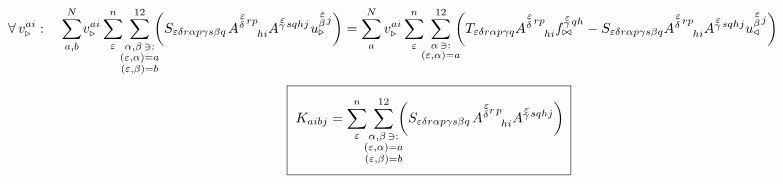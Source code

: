\begin{equation}
   \hspace{-18mm}
   \forall \, v^{ai}_{\triangleright}: \quad
   \sum^N_{a,b} \mkern-2mu v^{a i}_{\triangleright}
   \sum^n_\varepsilon
   \mkern-7mu
   \sum_{\substack{\alpha, \beta \, \ni: \\ (\varepsilon,\alpha) = a \\ (\varepsilon,\beta) = b}}^{12}
   \mkern-10mu
   \qty(
   S_{\varepsilon \delta r \alpha p \gamma s \beta q} \mkern2mu
   A^{\substack{\mkern2mu \varepsilon \\[0.12mm] \delta} \mkern2mu r p}_{\mkern29mu hi}    A^{\substack{\mkern2mu \varepsilon \\[-0.59mm] \gamma} \mkern2mu s q h j} \mkern1mu     u^{\substack{\mkern2mu \varepsilon \\[0.14mm] \beta} \mkern2mu j}_\triangleright )
   =
   \sum^N_a v^{ai}_{\triangleright}
   \sum^n_\varepsilon
   \mkern-7mu
   \sum_{\substack{\alpha \, \ni: \\ (\varepsilon,\alpha) = a}}^{12}
   \mkern-10mu
   \qty(
   T_{\varepsilon \delta r \alpha p \gamma q}
   A^{\substack{\mkern2mu \varepsilon \\[0.12mm] \delta} \mkern2mu r p}_{\mkern29mu hi}    f^{\substack{\mkern2mu \varepsilon \\[-0.59mm] \gamma} \mkern2mu q h}_{\bowtie}
   -
   S_{\varepsilon \delta r \alpha p \gamma s \beta q}    A^{\substack{\mkern2mu \varepsilon \\[0.12mm] \delta} \mkern2mu r p}_{\mkern29mu hi}    A^{\substack{\mkern2mu \varepsilon \\[-0.59mm] \gamma} \mkern2mu s q h j}    u^{\substack{\mkern2mu \varepsilon \\[0.14mm] \beta} \mkern2mu j}_\triangleleft )
\end{equation}
\begin{equation}
   \boxed{ \phantom{\rule[-12mm]{1mm}{20mm}}
   K_{aibj} =
   \sum^n_\varepsilon
   \mkern-7mu
   \sum_{\substack{\alpha, \beta \, \ni: \\ (\varepsilon,\alpha) = a \\ (\varepsilon,\beta) = b}}^{12}
   \mkern-10mu
   \qty(
   S_{\varepsilon \delta r \alpha p \gamma s \beta q} \mkern2mu
   A^{\substack{\mkern2mu \varepsilon \\[0.12mm] \delta} r \mkern2mu p}_{\mkern29mu hi}    A^{\substack{\mkern2mu \varepsilon \\[-0.59mm] \gamma} \mkern2mu  s q h j} ) \mkern3mu }
\end{equation}
